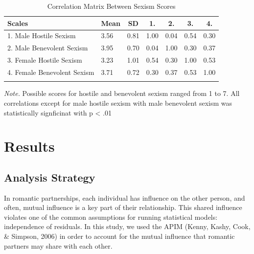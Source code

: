 \documentclass[
  man]{apa6}
\begin{document}
\begin{table}[tbp]

\begin{center}
\begin{threeparttable}

\caption{\label{tab:unnamed-chunk-2}Correlation Matrix Between Sexism Scores}

\begin{tabular}{lllllll}
\toprule
Scales & \multicolumn{1}{c}{Mean} & \multicolumn{1}{c}{SD} & \multicolumn{1}{c}{1.} & \multicolumn{1}{c}{2.} & \multicolumn{1}{c}{3.} & \multicolumn{1}{c}{4.}\\
\midrule
1. Male Hostile Sexism & 3.56 & 0.81 & 1.00 & 0.04 & 0.54 & 0.30\\
2. Male Benevolent Sexism & 3.95 & 0.70 & 0.04 & 1.00 & 0.30 & 0.37\\
3. Female Hostile Sexism & 3.23 & 1.01 & 0.54 & 0.30 & 1.00 & 0.53\\
4. Female Benevolent Sexism & 3.71 & 0.72 & 0.30 & 0.37 & 0.53 & 1.00\\
\bottomrule
\addlinespace
\end{tabular}

\begin{tablenotes}[para]
\normalsize{\textit{Note.} Possible scores for hostile and benevolent sexism ranged from 1 to 7. All correlations except for male hostile sexism with male benevolent sexism was statistically signficinat with p < .01}
\end{tablenotes}

\end{threeparttable}
\end{center}

\end{table}

\hypertarget{results}{%
\section{Results}\label{results}}

\hypertarget{analysis-strategy}{%
\subsection{Analysis Strategy}\label{analysis-strategy}}

In romantic partnerships, each individual has influence on the other person, and often, mutual influence is a key part of their relationship. This shared influence violates one of the common assumptions for running statistical models: independence of residuals. In this study, we used the APIM (Kenny, Kashy, Cook, \& Simpson, 2006) in order to account for the mutual influence that romantic partners may share with each other.
\end{document}

